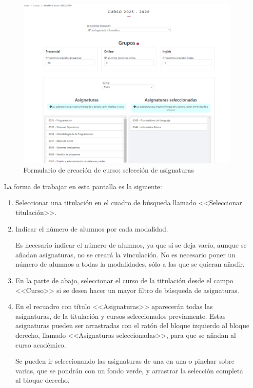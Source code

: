 \begin{figure}
	\centering
	\includegraphics[width=\textwidth]{../img/Anexos/Manual usuario/formCurso2.png}
	\caption{Formulario de creación de curso: selección de asignaturas}\label{pag:formCurso2}
\end{figure}

La forma de trabajar en esta pantalla es la siguiente: 
\begin{enumerate}
\item Seleccionar una titulación en el cuadro de búsqueda llamado <<Seleccionar titulación>>.
\item Indicar el número de alumnos por cada modalidad.

Es necesario indicar el número de alumnos, ya que si se deja vacío, aunque se añadan asignaturas, no se creará la vinculación. No es necesario poner un número de alumnos a todas la modalidades, sólo a las que se quieran añadir.
\item En la parte de abajo, seleccionar el curso de la titulación desde el campo <<Curso>> si se desea hacer un mayor filtro de búsqueda de asignaturas.
\item En el recuadro con título <<Asignaturas>> aparecerán todas las asignaturas, de la titulación y cursos seleccionados previamente.
Estas asignaturas pueden ser arrastradas con el ratón del bloque izquierdo al bloque derecho, llamado <<Asignaturas seleccionadas>>, para que se añadan al curso académico.

Se pueden ir seleccionando las asignaturas de una en una o pinchar sobre varias, que se pondrán con un fondo verde, y arrastrar la selección completa al bloque derecho.
\end{enumerate}

